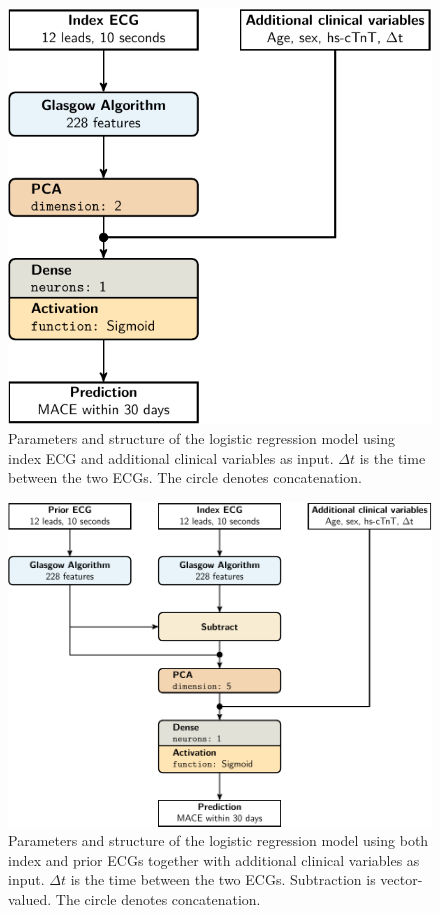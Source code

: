 \documentclass[preprint]{elsarticle}
\begin{document}
\begin{figure}[H]
\centering
\includegraphics[scale=\modelscale,keepaspectratio,trim=-16em 0 0 0]{figures/model-lr3.pdf}
\caption{Parameters and structure of the logistic regression model using index ECG and additional clinical variables as input. $\Delta t$ is the time between the two ECGs. The circle denotes concatenation.}
\end{figure}

\begin{figure}[H]
\centering
\includegraphics[scale=\modelscale,keepaspectratio]{figures/model-lr4.pdf}
\caption{Parameters and structure of the logistic regression model using both index and prior ECGs together with additional clinical variables as input. $\Delta t$ is the time between the two ECGs. Subtraction is vector-valued. The circle denotes concatenation. }
\end{figure}
\end{document}
